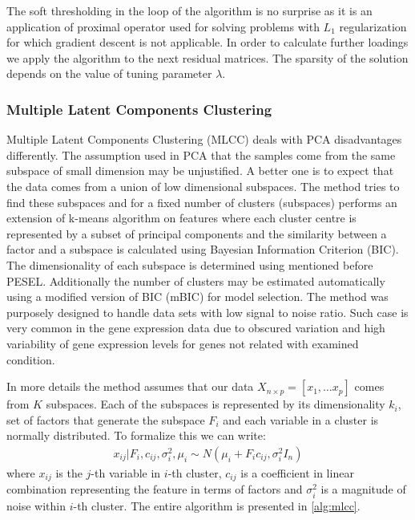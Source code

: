 \documentclass[shortabstract, english, mgr]{iithesis}
\begin{document}
The soft thresholding in the loop of the algorithm is no surprise as it is an application of proximal operator used for solving problems with $L_1$ regularization for which gradient descent is not applicable. In order to calculate further loadings we apply the algorithm to the next residual matrices. The sparsity of the solution depends on the value of tuning parameter $\lambda$.

\subsubsection{Multiple Latent Components Clustering}

Multiple Latent Components Clustering (MLCC) deals with PCA disadvantages differently. The assumption used in PCA that the samples come from the same subspace of small dimension may be unjustified. A better one is to expect that the data comes from a union of low dimensional subspaces. The method tries to find these subspaces and for a fixed number of clusters (subspaces) performs an extension of k-means algorithm on features where each cluster centre is represented by a subset of principal components and the similarity between a factor and a subspace is calculated using Bayesian Information Criterion (BIC). The dimensionality of each subspace is determined using mentioned before PESEL. Additionally the number of clusters may be estimated automatically using a modified version of BIC (mBIC) for model selection. The method was purposely designed to handle data sets with low signal to noise ratio. Such case is very common in the gene expression data due to obscured variation and high variability of gene expression levels for genes not related with examined condition.

In more details the method assumes that our data $X_{n\times p} = [x_1, \ldots x_p]$ comes from $K$ subspaces. Each of the subspaces is represented by its dimensionality $k_i$, set of factors that generate the subspace $F_i$ and each variable in a cluster is normally distributed. To formalize this we can write:
\begin{align*}
    x_{i j} | F_{i}, c_{i j}, \sigma_{i}^{2}, \mu_{i} \sim N\left(\mu_{i} + F_{i} c_{i j}, \sigma_{i}^{2} I_{n}\right)
\end{align*} 
where $x_{ij}$ is the $j$-th variable in $i$-th cluster, $c_{ij}$ is a coefficient in linear combination representing the feature in terms of factors and $\sigma_i^2$ is a magnitude of noise within $i$-th cluster. The entire algorithm is presented in \ref{alg:mlcc}.
\end{document}
